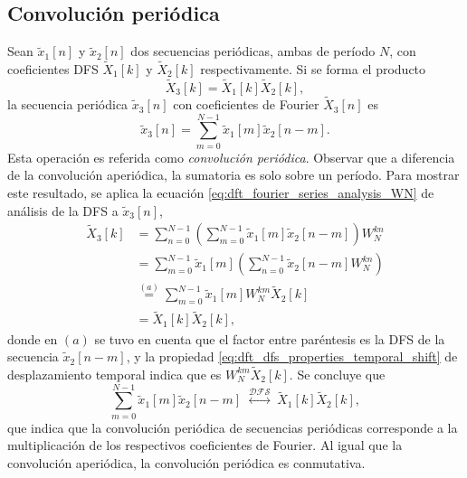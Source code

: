 \documentclass[a4paper]{report}
\begin{document}
\subsection{Convolución periódica}\label{sec:dft_dfs_properties_periodic_convolution}

Sean \(\tilde{x}_1[n]\) y \(\tilde{x}_2[n]\) dos secuencias periódicas, ambas de período \(N\), con coeficientes DFS \(\tilde{X}_1[k]\) y \(\tilde{X}_2[k]\) respectivamente. Si se forma el producto
\[
 \tilde{X}_3[k]=\tilde{X}_1[k]\tilde{X}_2[k],
\]
la secuencia periódica \(\tilde{x}_3[n]\) con coeficientes de Fourier \(\tilde{X}_3[n]\) es
\begin{equation}\label{eq:dft_dfs_properties_periodic_convolution}
 \tilde{x}_3[n]=\sum_{m=0}^{N-1}\tilde{x}_1[m]\tilde{x}_2[n-m]. 
\end{equation}
Esta operación es referida como \emph{convolución periódica}. Observar que a diferencia de la convolución aperiódica, la sumatoria es solo sobre un período. Para mostrar este resultado, se aplica la ecuación \ref{eq:dft_fourier_series_analysis_WN} de análisis de la DFS a \(\tilde{x}_3[n]\),
\begin{align*}
 \tilde{X}_3[k]&=\sum_{n=0}^{N-1}\left(\sum_{m=0}^{N-1}\tilde{x}_1[m]\tilde{x}_2[n-m]\right)W_N^{kn}\\
   &=\sum_{m=0}^{N-1}\tilde{x}_1[m]\left(\sum_{n=0}^{N-1}\tilde{x}_2[n-m]W_N^{kn}\right)\\
   &\overset{(a)}{=}\sum_{m=0}^{N-1}\tilde{x}_1[m]W_N^{km}\tilde{X}_2[k]\\
   &=\tilde{X}_1[k]\tilde{X}_2[k],
\end{align*}
donde en \((a)\) se tuvo en cuenta que el factor entre paréntesis es la DFS de la secuencia \(\tilde{x}_2[n-m]\), y la propiedad \ref{eq:dft_dfs_properties_temporal_shift} de desplazamiento temporal indica que es \(W_N^{km}\tilde{X}_2[k]\). Se concluye que 
\begin{equation}\label{eq:dft_dfs_properties_frequency_product}
 \sum_{m=0}^{N-1}\tilde{x}_1[m]\tilde{x}_2[n-m]
 \;\overset{\mathcal{DFS}}{\longleftrightarrow}\;
 \tilde{X}_1[k]\tilde{X}_2[k],
\end{equation}
que indica que la convolución periódica de secuencias periódicas corresponde a la multiplicación de los respectivos coeficientes de Fourier. Al igual que la convolución aperiódica, la convolución periódica es conmutativa.  
\end{document}
